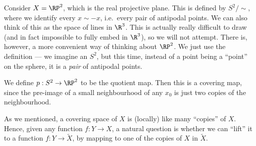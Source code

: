 \documentclass[a4paper]{article}
\begin{document}
\begin{eg}
  Consider $X = \RP^2$, which is the real projective plane. This is defined by $S^2/{\sim}$, where we identify every $x\sim -x$, i.e.\ every pair of antipodal points. We can also think of this as the space of lines in $\R^3$. This is actually really difficult to draw (and in fact impossible to fully embed in $\R^3$), so we will not attempt. There is, however, a more convenient way of thinking about $\RP^2$. We just use the definition --- we imagine an $S^2$, but this time, instead of a point being a ``point'' on the sphere, it is a \emph{pair} of antipodal points.
  \begin{center}
  \end{center}
  We define $p: S^2 \to \RP^2$ to be the quotient map. Then this is a covering map, since the pre-image of a small neighbourhood of any $x_0$ is just two copies of the neighbourhood.
\end{eg}

As we mentioned, a covering space of $X$ is (locally) like many ``copies'' of $X$. Hence, given any function $f: Y \to X$, a natural question is whether we can ``lift'' it to a function $f: Y \to \tilde{X}$, by mapping to one of the copies of $X$ in $\tilde{X}$.
\end{document}
